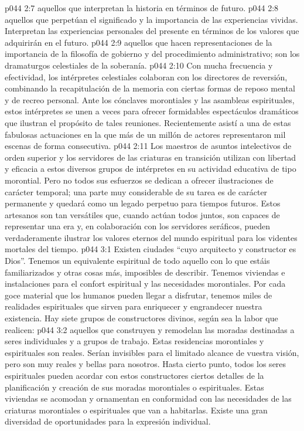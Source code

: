 \vs p044 2:7  aquellos que interpretan la historia en términos de futuro.
\vs p044 2:8  aquellos que perpetúan el significado y la importancia de las experiencias vividas. Interpretan las experiencias personales del presente en términos de los valores que adquirirán en el futuro.
\vs p044 2:9  aquellos que hacen representaciones de la importancia de la filosofía de gobierno y del procedimiento administrativo; son los dramaturgos celestiales de la soberanía.
\vs p044 2:10 \pc Con mucha frecuencia y efectividad, los intérpretes celestiales colaboran con los directores de reversión, combinando la recapitulación de la memoria con ciertas formas de reposo mental y de recreo personal. Ante los cónclaves morontiales y las asambleas espirituales, estos intérpretes se unen a veces para ofrecer formidables espectáculos dramáticos que ilustran el propósito de tales reuniones. Recientemente asistí a una de estas fabulosas actuaciones en la que más de un millón de actores representaron mil escenas de forma consecutiva.
\vs p044 2:11 Los maestros de asuntos intelectivos de orden superior y los servidores de las criaturas en transición utilizan con libertad y eficacia a estos diversos grupos de intérpretes en su actividad educativa de tipo morontial. Pero no todos sus esfuerzos se dedican a ofrecer ilustraciones de carácter temporal; una parte muy considerable de su tarea es de carácter permanente y quedará como un legado perpetuo para tiempos futuros. Estos artesanos son tan versátiles que, cuando actúan todos juntos, son capaces de representar una era y, en colaboración con los servidores seráficos, pueden verdaderamente ilustrar los valores eternos del mundo espiritual para los videntes mortales del tiempo.
\vs p044 3:1 Existen ciudades “cuyo arquitecto y constructor es Dios”. Tenemos un equivalente espiritual de todo aquello con lo que estáis familiarizados y otras cosas más, imposibles de describir. Tenemos viviendas e instalaciones para el confort espiritual y las necesidades morontiales. Por cada goce material que los humanos pueden llegar a disfrutar, tenemos miles de realidades espirituales que sirven para enriquecer y engrandecer nuestra existencia. Hay siete grupos de constructores divinos, según sea la labor que realicen:
\vs p044 3:2  aquellos que construyen y remodelan las moradas destinadas a seres individuales y a grupos de trabajo. Estas residencias morontiales y espirituales son reales. Serían invisibles para el limitado alcance de vuestra visión, pero son muy reales y bellas para nosotros. Hasta cierto punto, todos los seres espirituales pueden acordar con estos constructores ciertos detalles de la planificación y creación de sus moradas morontiales o espirituales. Estas viviendas se acomodan y ornamentan en conformidad con las necesidades de las criaturas morontiales o espirituales que van a habitarlas. Existe una gran diversidad de oportunidades para la expresión individual.
